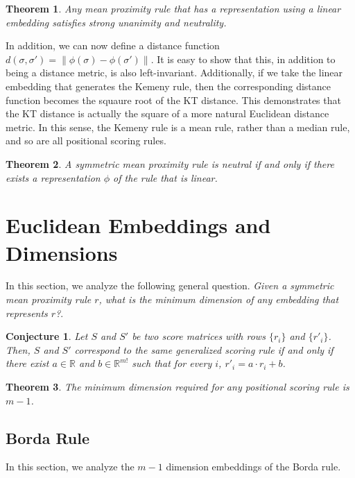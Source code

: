 \documentclass[10pt,letterpaper]{article}
\newtheorem{theorem}{Theorem}
\newtheorem{conjecture}{Conjecture}
\begin{document}
\begin{theorem}
Any mean proximity rule that has a representation using a linear embedding satisfies strong unanimity and neutrality. 
\end{theorem}

In addition, we can now define a distance function $d(\sigma,\sigma') = \|\phi(\sigma)-\phi(\sigma')\|$. It is easy to show that this, in addition to being a distance metric, is also left-invariant. Additionally, if we take the linear embedding that generates the Kemeny rule, then the corresponding distance function becomes the squaure root of the KT distance. This demonstrates that the KT distance is actually the square of a more natural Euclidean distance metric. In this sense, the Kemeny rule is a mean rule, rather than a median rule, and so are all positional scoring rules. 

\begin{theorem}
A symmetric mean proximity rule is neutral if and only if there exists a representation $\phi$ of the rule that is linear. 
\label{thm:neutrality-linear-embedding}
\end{theorem}

\section{Euclidean Embeddings and Dimensions}

In this section, we analyze the following general question. \emph{Given a symmetric mean proximity rule $r$, what is the minimum dimension of any embedding that represents $r$?}. 

\begin{conjecture}
Let $S$ and $S'$ be two score matrices with rows $\{r_i\}$ and $\{r'_i\}$. Then, $S$ and $S'$ correspond to the same generalized scoring rule if and only if there exist $a \in \mathbb{R}$ and $b \in \mathbb{R}^{m!}$ such that for every $i$, $r'_i = a \cdot r_i + b$. 
\end{conjecture}

\begin{theorem}
The minimum dimension required for any positional scoring rule is $m-1$. 
\end{theorem}

\subsection{Borda Rule}
In this section, we analyze the $m-1$ dimension embeddings of the Borda rule. 
\end{document}
